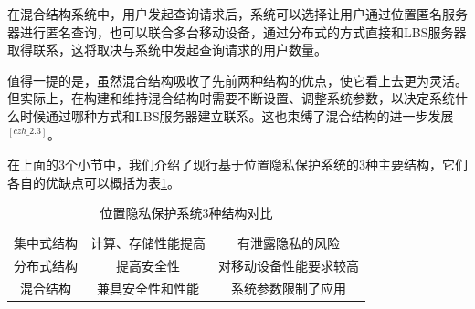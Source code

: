 \documentclass[zihao=-4]{ctexart}
\begin{document}
在混合结构系统中，用户发起查询请求后，系统可以选择让用户通过位置匿名服务器进行匿名查询，也可以联合多台移动设备，通过分布式的方式直接和LBS服务器取得联系，这将取决与系统中发起查询请求的用户数量。
\par
值得一提的是，虽然混合结构吸收了先前两种结构的优点，使它看上去更为灵活。但实际上，在构建和维持混合结构时需要不断设置、调整系统参数，以决定系统什么时候通过哪种方式和LBS服务器建立联系。这也束缚了混合结构的进一步发展$^{[czh\_2.3]}$。
\par \par 
在上面的3个小节中，我们介绍了现行基于位置隐私保护系统的3种主要结构，它们各自的优缺点可以概括为表\ref{3种结构对比}。
\fi 

\begin{table}[H]
	\caption{位置隐私保护系统3种结构对比}
	\centering
	\label{3种结构对比}
	\begin{tabular}{ccc}
		\hline  
		\makebox[0.1\textwidth][c]{结构名称} & \makebox[0.4\textwidth][c]{优点} & \makebox[0.4\textwidth][c]{缺点}  \\ 
		\hline  
		集中式结构	&	计算、存储性能提高	&	有泄露隐私的风险\\
		分布式结构	&	提高安全性		   &	对移动设备性能要求较高\\
		混合结构	 &	兼具安全性和性能	 & 		系统参数限制了应用\\
		\hline
	\end{tabular} 
\end{table} 

\end{document}
